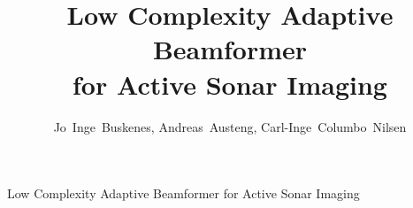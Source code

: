 \documentclass[10pt,journal,draftclsnofoot,onecolumn]{IEEEtran}
\newcommand\1{\vec 1}
\begin{document}
\title{Low Complexity Adaptive Beamformer\\ for Active Sonar Imaging}

\author{Jo~Inge~Buskenes, %
        Andreas~Austeng, %
        Carl-Inge~Columbo~Nilsen%

}

%
{Low Complexity Adaptive Beamformer for Active Sonar Imaging}


\end{document}

